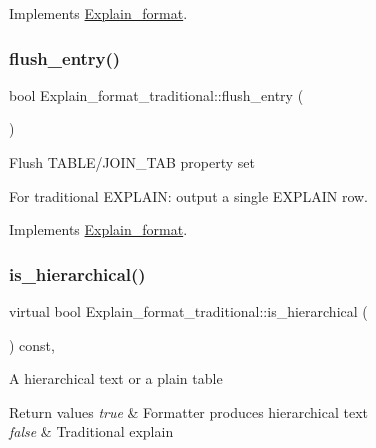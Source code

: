 Implements \mbox{\hyperlink{classExplain__format_aa822adf89028df0cdb74d39065ee9e5a}{Explain\+\_\+format}}.

\mbox{\label{classExplain__format__traditional_a991e2af5a82b9f25cee94564ee4c7000}} 
\subsubsection{\texorpdfstring{flush\+\_\+entry()}{flush\_entry()}}
{\footnotesize\ttfamily bool Explain\+\_\+format\+\_\+traditional\+::flush\+\_\+entry (\begin{DoxyParamCaption}{ }\end{DoxyParamCaption})\hspace{0.3cm}{\ttfamily [virtual]}}

Flush T\+A\+B\+L\+E/\+J\+O\+I\+N\+\_\+\+T\+AB property set

For traditional E\+X\+P\+L\+A\+IN\+: output a single E\+X\+P\+L\+A\+IN row. 

Implements \mbox{\hyperlink{classExplain__format_a3907382576a43a2fa4ed554f5d13e158}{Explain\+\_\+format}}.

\mbox{\label{classExplain__format__traditional_a8861c3fd3ab2ed3523a0c1fcaa172645}} 
\subsubsection{\texorpdfstring{is\+\_\+hierarchical()}{is\_hierarchical()}}
{\footnotesize\ttfamily virtual bool Explain\+\_\+format\+\_\+traditional\+::is\+\_\+hierarchical (\begin{DoxyParamCaption}{ }\end{DoxyParamCaption}) const\hspace{0.3cm}{\ttfamily [inline]}, {\ttfamily [virtual]}}

A hierarchical text or a plain table


\begin{DoxyRetVals}{Return values}
{\em true} & Formatter produces hierarchical text \\
\hline
{\em false} & Traditional explain \\
\hline
\end{DoxyRetVals}


